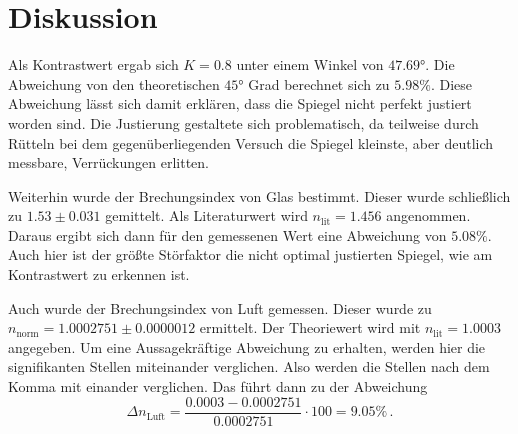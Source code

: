 \section{Diskussion}
\label{sec:Diskussion}
Als Kontrastwert ergab sich $K = 0.8$ unter einem Winkel von $47.69°$.
Die Abweichung von den theoretischen $45°$ Grad berechnet sich zu $5.98 \% $.
Diese Abweichung lässt sich damit erklären, dass die Spiegel nicht perfekt justiert worden sind.
Die Justierung gestaltete sich problematisch, da teilweise durch Rütteln bei dem gegenüberliegenden Versuch die Spiegel kleinste, aber deutlich messbare, Verrückungen erlitten.

Weiterhin wurde der Brechungsindex von Glas bestimmt.
Dieser wurde schließlich zu $1.53 \pm 0.031$ gemittelt.
Als Literaturwert wird $n_\text{lit} = 1.456$ angenommen.
Daraus ergibt sich dann für den gemessenen Wert eine Abweichung von $5.08 \%$.
Auch hier ist der größte Störfaktor die nicht optimal justierten Spiegel, wie am Kontrastwert zu erkennen ist.

Auch wurde der Brechungsindex von Luft gemessen.
Dieser wurde zu $n_{\text{norm}} = 1.0002751 \pm 0.0000012$ ermittelt.
Der Theoriewert wird mit $n_\text{lit} = 1.0003$ angegeben.
Um eine Aussagekräftige Abweichung  zu erhalten, werden hier die signifikanten Stellen miteinander verglichen.
Also werden die Stellen nach dem Komma mit einander verglichen.
Das führt dann zu der Abweichung
\begin{equation*}
\Delta n_\text{Luft} = \frac{0.0003 - 0.0002751}{0.0002751} \cdot 100 = 9.05 \% \, .
\end{equation*}
